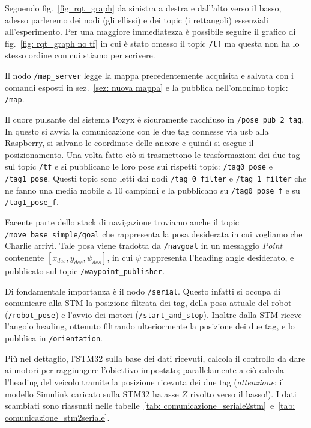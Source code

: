 Seguendo fig.~\ref{fig: rqt_graph} da sinistra a destra e dall'alto verso il basso, adesso parleremo dei nodi (gli ellissi) e dei topic (i rettangoli) essenziali all'esperimento.
Per una maggiore immediatezza \`e possibile seguire il grafico di fig.~\ref{fig: rqt_graph no tf} in cui \`e stato omesso il topic \verb|/tf| ma questa non ha lo stesso ordine con cui stiamo per scrivere.

\vspace{0.5mm}
Il nodo \verb|/map_server| legge la mappa precedentemente acquisita e salvata con i comandi esposti in sez.~\ref{sez: nuova mappa} e la pubblica nell'omonimo topic: \verb|/map|.

Il cuore pulsante del sistema Pozyx \`e sicuramente racchiuso in \verb|/pose_pub_2_tag|. In questo si avvia la comunicazione con le due tag connesse via usb alla Raspberry, si salvano le coordinate delle ancore e quindi si esegue il posizionamento. 
Una volta fatto ci\`o si trasmettono le trasformazioni dei due tag sul topic \verb|/tf| e si pubblicano le loro pose sui rispetti topic: \verb|/tag0_pose| e \verb|/tag1_pose|.
Questi topic sono letti dai nodi \verb|/tag_0_filter| e \verb|/tag_1_filter| che ne fanno una media mobile a 10 campioni e la pubblicano su \verb|/tag0_pose_f| e su \verb|/tag1_pose_f|.

\vspace{0.5mm}
Facente parte dello stack di navigazione troviamo anche il topic \verb|/move_base_simple/goal| che rappresenta la posa desiderata in cui vogliamo che Charlie arrivi. 
Tale posa viene tradotta da \verb|/navgoal| in un messaggio \textit{Point} contenente $[x_{des}, y_{des}, \psi_{des}]$, in cui $\psi$ rappresenta l'heading angle desiderato, e pubblicato sul topic \verb|/waypoint_publisher|.

\vspace{0.5mm}
Di fondamentale importanza \`e il nodo \verb|/serial|. Questo infatti si occupa di comunicare alla STM la posizione filtrata dei tag, della posa attuale del robot (\verb|/robot_pose|) e l'avvio dei motori (\verb|/start_and_stop|). 
Inoltre dalla STM riceve l'angolo heading, ottenuto filtrando ulteriormente la posizione dei due tag, e lo pubblica in \verb|/orientation|.

Pi\`u nel dettaglio, l'STM32 sulla base dei dati ricevuti, calcola il controllo da dare ai motori per raggiungere l’obiettivo impostato; parallelamente a ciò calcola l'heading del veicolo tramite la posizione ricevuta dei due tag (\textit{attenzione}: il modello Simulink caricato sulla STM32 ha asse $Z$ rivolto verso il basso!).
I dati scambiati sono riassunti nelle tabelle~\ref{tab: comunicazione_seriale2stm}~e~\ref{tab: comunicazione_stm2seriale}.

